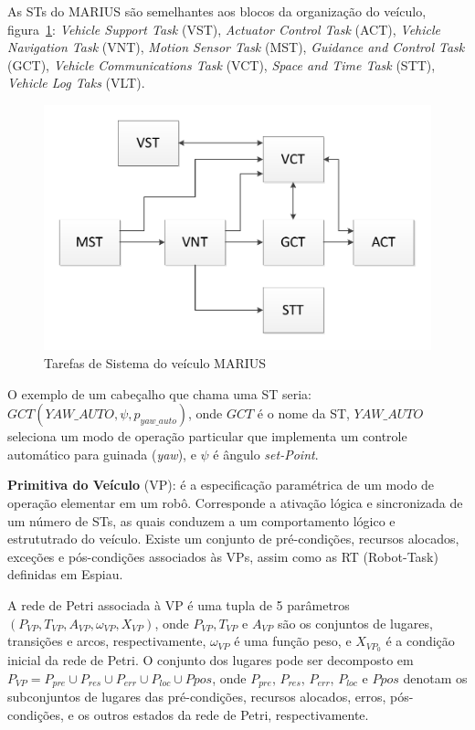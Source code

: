 As STs do MARIUS são semelhantes aos blocos da organização do veículo,
figura~\ref{SILVA_2}:
\emph{Vehicle Support Task} (VST), \emph{Actuator Control Task} (ACT),
\emph{Vehicle Navigation Task} (VNT), \emph{Motion Sensor Task} (MST),
\emph{Guidance and Control Task} (GCT), \emph{Vehicle Communications Task}
(VCT), \emph{Space and Time Task} (STT), \emph{Vehicle Log Taks} (VLT). 

\begin{figure}[H]
\centering
\includegraphics[width=1\columnwidth]{figs/SILVA_2.pdf}
\caption{Tarefas de Sistema do veículo MARIUS}
\label{SILVA_2}
\end{figure}

O exemplo de um cabeçalho que chama uma ST seria:
$GCT(YAW\_AUTO,\psi,p_{yaw\_auto})$, onde $GCT$ é o nome da ST, $YAW\_AUTO$
seleciona um modo de operação particular que implementa um controle automático
para guinada (\emph{yaw}), e $\psi$ é ângulo \emph{set-Point}.

\textbf{Primitiva do Veículo} (VP): é a especificação paramétrica de um modo
de operação elementar em um robô. Corresponde a ativação lógica e sincronizada
de um número de STs, as quais conduzem a um comportamento lógico e estrututrado
do veículo. Existe um conjunto de pré-condições, recursos alocados, exceções e
pós-condições associados às VPs, assim como as RT (Robot-Task) definidas em
Espiau.

A rede de Petri associada à VP é uma tupla de 5 parâmetros
$(P_{VP},T_{VP},A_{VP},\omega_{VP},X_{VP})$, onde $P_{VP},T_{VP}$ e $A_{VP}$ são
os conjuntos de lugares, transições e arcos, respectivamente, $\omega_{VP}$ é
uma função peso, e $X_{VP_{0}}$ é a condição inicial da rede de Petri. O
conjunto dos lugares pode ser decomposto em $P_{VP}=P_{pre}\cup P_{res}\cup
P_{err}\cup P_{loc}\cup P{pos}$, onde $P_{pre}$, $P_{res}$, $P_{err}$,
$P_{loc}$ e $P{pos}$ denotam os subconjuntos de lugares das pré-condições,
recursos alocados, erros, pós-condições, e os outros estados da rede de Petri,
respectivamente.

